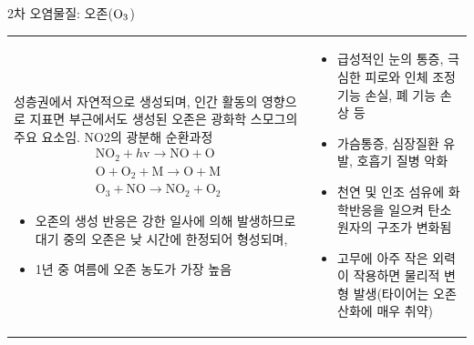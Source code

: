 \begin{frame}[t]{2차 오염물질: 오존($\rm{{O}_{3}}$)}
	\begin{tabular}{ll}
		\begin{minipage}[t]{0.475\textwidth}\scriptsize
			성층권에서 자연적으로 생성되며, 인간 활동의 영향으로 지표면 부근에서도 생성된 오존은 광화학 스모그의 주요 요소임.
				NO2의 광분해 순환과정
				$$
					\begin{array}{l}
					\mathrm{NO}_{2}+h \mathrm{v} \rightarrow \mathrm{NO}+\mathrm{O} \\
					\mathrm{O}+\mathrm{O}_{2}+\mathrm{M} \rightarrow \mathrm{O}+\mathrm{M} \\
					\mathrm{O}_{3}+\mathrm{NO} \rightarrow \mathrm{NO}_{2}+\mathrm{O}_{2}
					\end{array}
				$$

			\begin{itemize}
				\item 오존의 생성 반응은 강한 일사에 의해 발생하므로 대기 중의 오존은 낮 시간에 한정되어 형성되며, 
				\item 1년 중 여름에 오존 농도가 가장 높음
			\end{itemize}

		\end{minipage}	
		&
		\begin{minipage}[t]{0.65\textwidth} \scriptsize	
			\begin{itemize}
				\item 급성적인 눈의 통증, 극심한 피로와 인체 조정 기능 손실, 폐 기능 손상 등
				\item 가슴통증, 심장질환 유발, 호흡기 질병 악화
				\item 천연 및 인조 섬유에 화학반응을 일으켜 탄소 원자의 구조가 변화됨
				\item 고무에 아주 작은 외력이 작용하면 물리적 변형 발생(타이어는 오존 산화에 매우 취약)
			\end{itemize}
		\end{minipage}
	\end{tabular}
\end{frame}



